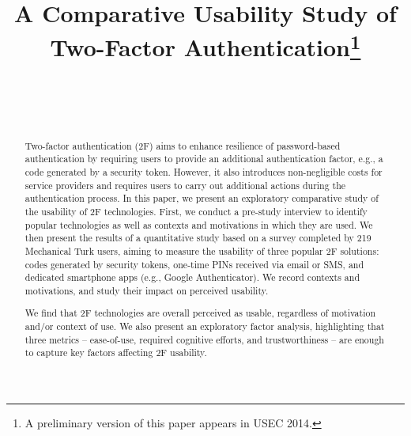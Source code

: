 \documentclass[conference]{IEEEtran}
\begin{document}
\title{A Comparative Usability Study of\\ Two-Factor Authentication\thanks{A preliminary version of this paper appears in USEC 2014.}}


\author{
\and
{}
\\
\and
{}
\\
\and
{}
}




\maketitle







\begin{abstract}
Two-factor authentication (2F) aims to enhance resilience of password-based authentication by requiring users to provide an additional authentication factor, e.g., a code generated by a security token. However, it also introduces non-negligible costs for service providers and requires users to carry out additional actions during the authentication process.
In this paper,  we present an exploratory comparative study of the usability of 2F technologies. First, we conduct a pre-study interview to identify popular technologies as well as contexts and motivations in which they are used. We then present the results of a quantitative study based on a survey completed by 219 Mechanical Turk users, aiming to measure the usability of three popular 2F solutions: codes generated by security tokens, one-time PINs received via email or SMS, and dedicated smartphone apps (e.g., Google Authenticator). We record contexts and motivations, and study their impact on perceived usability.

We find that 2F technologies are overall perceived as usable, regardless of motivation and/or context of use. We also present an exploratory factor analysis, highlighting that three metrics -- ease-of-use, required cognitive efforts, and trustworthiness -- are enough to capture key factors affecting 2F usability.
\end{abstract}
\end{document}
